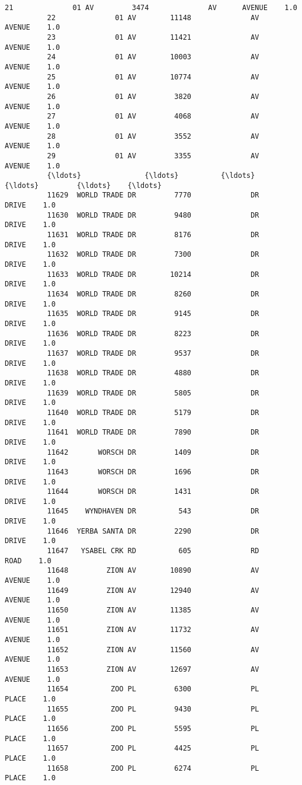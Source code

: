 \documentclass[11pt]{article}
\begin{document}
\begin{Verbatim}[commandchars=\\\{\}]
          21              01 AV         3474              AV      AVENUE    1.0
          22              01 AV        11148              AV      AVENUE    1.0
          23              01 AV        11421              AV      AVENUE    1.0
          24              01 AV        10003              AV      AVENUE    1.0
          25              01 AV        10774              AV      AVENUE    1.0
          26              01 AV         3820              AV      AVENUE    1.0
          27              01 AV         4068              AV      AVENUE    1.0
          28              01 AV         3552              AV      AVENUE    1.0
          29              01 AV         3355              AV      AVENUE    1.0
          {\ldots}               {\ldots}          {\ldots}             {\ldots}         {\ldots}    {\ldots}
          11629  WORLD TRADE DR         7770              DR       DRIVE    1.0
          11630  WORLD TRADE DR         9480              DR       DRIVE    1.0
          11631  WORLD TRADE DR         8176              DR       DRIVE    1.0
          11632  WORLD TRADE DR         7300              DR       DRIVE    1.0
          11633  WORLD TRADE DR        10214              DR       DRIVE    1.0
          11634  WORLD TRADE DR         8260              DR       DRIVE    1.0
          11635  WORLD TRADE DR         9145              DR       DRIVE    1.0
          11636  WORLD TRADE DR         8223              DR       DRIVE    1.0
          11637  WORLD TRADE DR         9537              DR       DRIVE    1.0
          11638  WORLD TRADE DR         4880              DR       DRIVE    1.0
          11639  WORLD TRADE DR         5805              DR       DRIVE    1.0
          11640  WORLD TRADE DR         5179              DR       DRIVE    1.0
          11641  WORLD TRADE DR         7890              DR       DRIVE    1.0
          11642       WORSCH DR         1409              DR       DRIVE    1.0
          11643       WORSCH DR         1696              DR       DRIVE    1.0
          11644       WORSCH DR         1431              DR       DRIVE    1.0
          11645    WYNDHAVEN DR          543              DR       DRIVE    1.0
          11646  YERBA SANTA DR         2290              DR       DRIVE    1.0
          11647   YSABEL CRK RD          605              RD        ROAD    1.0
          11648         ZION AV        10890              AV      AVENUE    1.0
          11649         ZION AV        12940              AV      AVENUE    1.0
          11650         ZION AV        11385              AV      AVENUE    1.0
          11651         ZION AV        11732              AV      AVENUE    1.0
          11652         ZION AV        11560              AV      AVENUE    1.0
          11653         ZION AV        12697              AV      AVENUE    1.0
          11654          ZOO PL         6300              PL       PLACE    1.0
          11655          ZOO PL         9430              PL       PLACE    1.0
          11656          ZOO PL         5595              PL       PLACE    1.0
          11657          ZOO PL         4425              PL       PLACE    1.0
          11658          ZOO PL         6274              PL       PLACE    1.0
          

\end{Verbatim}
\end{document}
